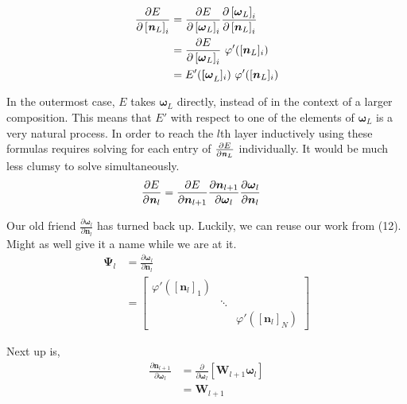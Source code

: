 \documentclass[12pt,letterpaper]{article}
\begin{document}
\begin{align}
\frac{\partial E}{ \partial \left[ \textbf{\textit{n}}_L \right]_i } 
&= 
\frac{\partial E}{ \partial \left[ \boldsymbol{\omega}_L \right]_i }
\frac{\partial \left[ \boldsymbol{\omega}_L \right]_i}{ \partial \left[ \boldsymbol{n}_L \right]_i } \\
&=
\frac{\partial E}{ \partial \left[ \boldsymbol{\omega}_L \right]_i }
\ \varphi'([\boldsymbol{n}_L]_i) \\
&=
E'(\boldsymbol{[\omega}_L]_i)
\ \varphi'([\boldsymbol{n}_L]_i)
\end{align}

In the outermost case, $E$ takes $\boldsymbol{\omega}_L$ directly, instead of in the context of a larger composition.  This means that $E'$ with respect to one of the elements of $\boldsymbol{\omega}_L$ is a very natural process.  In order to reach the $l$th layer inductively using these formulas requires solving for each entry of 
$\frac{\partial E}{ \partial \textbf{\textit{n}}_L }$
individually.  It would be much less clumsy to solve simultaneously.
\begin{align}
\frac{\partial E}{ \partial \textbf{\textit{n}}_l } 
&= 
\frac{\partial E}{\partial \boldsymbol{n}_{l+1}}
\frac{\partial \boldsymbol{n}_{l+1}}{ \partial \boldsymbol{\omega}_l }
\frac{\partial \boldsymbol{\omega}_l }{ \partial \boldsymbol{n}_l }
\end{align}

Our old friend 
$\frac{\partial \boldsymbol{\omega}_l }{ \partial \boldsymbol{n}_l }$
has turned back up.  Luckily, we can reuse our work from (12).  Might as well give it a name while we are at it.
\begin{align}
\boldsymbol{\Psi}_l
&= 
\frac{\partial \boldsymbol{\omega}_l }{ \partial \boldsymbol{n}_l } \\
&=
\begin{bmatrix}
\varphi'(\left[\boldsymbol{n}_l\right]_1) & \\ 
& \ddots &\\ 
& & \varphi'(\left[\boldsymbol{n}_l\right]_N)
\end{bmatrix}
\end{align}

Next up is,
\begin{align}
\frac{\partial \boldsymbol{n}_{l+1}}{ \partial \boldsymbol{\omega}_l }
&= 
\frac{\partial }{ \partial \boldsymbol{\omega}_l } 
\left[ 
\boldsymbol{W}_{l+1} \boldsymbol{\omega}_l
\right] \\
&=
\boldsymbol{W}_{l+1}
\end{align}
\end{document}

